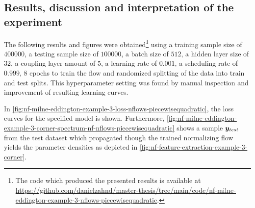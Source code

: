 \documentclass[a4paper,12pt]{report}
\begin{document}
\subsection{Results, discussion and interpretation of the experiment}
The following results and figures were obtained\footnote{The code which produced the presented results is available at \url{https://github.com/danielzahnd/master-thesis/tree/main/code/nf-milne-eddington-example-3-nflows-piecewisequadratic}.} using a training sample size of $400000$, a testing sample size of $100000$, a batch size of $512$, a hidden layer size of $32$, a coupling layer amount of $5$, a learning rate of $0.001$, a scheduling rate of $0.999$, $8$ epochs to train the flow and randomized splitting of the data into train and test splits. This hyperparameter setting was found by manual inspection and improvement of resulting learning curves.

In \cref{fig:nf-milne-eddington-example-3-loss-nflows-piecewisequadratic}, the loss curves for the specified model is shown. Furthermore, \cref{fig:nf-milne-eddington-example-3-corner-spectrum-nf-nflows-piecewisequadratic} shows a sample $\bm{y}_{test}$ from the test dataset which propagated though the trained normalizing flow yields the parameter densities as depicted in \cref{fig:nf-feature-extraction-example-3-corner}.
\end{document}
